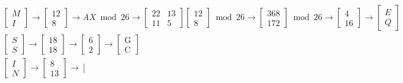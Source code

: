 \documentclass{article}
\begin{document}
$$
\begin{array}{l}
{\left[\begin{array}{l}
M \\
I
\end{array}\right] \rightarrow\left[\begin{array}{l}
12 \\
8
\end{array}\right] \rightarrow AX \bmod 26 \rightarrow \left[\begin{array}{cc}
22 & 13 \\
11 & 5
\end{array}\right]\left[\begin{array}{l}
12 \\
8
\end{array}\right]} \bmod 26  \rightarrow \left[\begin{array}{l}
368 \\
172
\end{array}\right] \bmod 26 \rightarrow \left[\begin{array}{l}
4 \\
16
\end{array}\right] \rightarrow\left[\begin{array}{l}
E \\
Q
\end{array}\right]\\
{\left[\begin{array}{l}
S \\
S
\end{array}\right] \rightarrow\left[\begin{array}{l}
18 \\
18
\end{array}\right] \rightarrow\left[\begin{array}{l}
6 \\
2
\end{array}\right] \rightarrow\left[\begin{array}{l}
\mathrm{G} \\
\mathrm{C}
\end{array}\right]} \\
{\left[\begin{array}{l}
I \\
N
\end{array}\right] \rightarrow\left[\begin{array}{l}
8 \\
13
\end{array}\right] \rightarrow \left[\begin{array}{l}

\end{array}}
\end{array}$$
\end{document}
